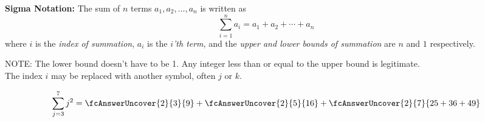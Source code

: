 \begin{frame}
\begin{definition}
 {\bf Sigma Notation:} The sum of $n$ terms $a_1,a_2,\ldots,a_n$ is written as
\[
\sum_{i=1}^n a_i=a_1+a_2+\cdots+a_n
\]                                     
where $i$ is 	the {\it index of summation}, $a_i$ is the {\it{$i$'th term}}, and the 
{\it{upper and lower bounds of summation}} are $n$ and $1$ respectively.
\end{definition}
NOTE:  The lower bound doesn't have to be 1. 
 Any integer less than or equal to the upper bound is legitimate.\\
The index $i$ may be replaced with another symbol, often $j$ or $k$.\\
\pause
\begin{example}
\[
\sum_{j=3}^7 j^2= \fcAnswerUncover{2}{3}{9}+  \fcAnswerUncover{2}{5}{16}+\fcAnswerUncover{2}{7}{25+36+49} 
\]
\end{example}

\end{frame}
